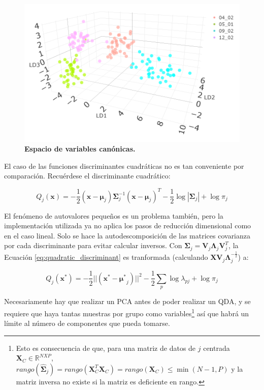 \documentclass[12pt]{article}
\begin{document}
\begin{figure}[htbp]
    \centering
    \includegraphics[width=14cm]{LDAspace.png}
    \caption{\textbf{Espacio de variables canónicas.}}
    \label{fig:LDAspace}
\end{figure}

El caso de las funciones discriminantes cuadráticas no es tan conveniente por comparación. Recuérdese el discriminante cuadrático:

\begin{equation} \label{eq:quadratic_discriminant}
Q_j (\mathbf{x}) = - \frac{1}{2} (\mathbf{x} - \boldsymbol{\mu}_j) \boldsymbol{\Sigma}_j^{-1} (\mathbf{x} - \boldsymbol{\mu}_j)^T  - \frac{1}{2} \log |\boldsymbol{\Sigma}_j| + \log \pi_j
\end{equation}

El fenómeno de autovalores pequeños es un problema también, pero la implementación utilizada ya no aplica los pasos de reducción dimensional como en el caso lineal. Solo se hace la autodescomposición de las matrices covarianza por cada discriminante para evitar calcular inversos. Con $\boldsymbol{\Sigma}_j = \mathbf{V}_j \boldsymbol{\Lambda}_j \mathbf{V}_j^T$, la Ecuación \ref{eq:quadratic_discriminant} es tranformada (calculando $\mathbf{X} \mathbf{V}_j \boldsymbol{\Lambda}_j^{-\frac{1}{2}}$) a:

\begin{equation} \label{eq:quadratic_discriminant_proy}
Q_j (\mathbf{x}^{*}) = - \frac{1}{2} ||(\mathbf{x}^{*} - {\mathbf{\mu}^{*}}_j) ||^2   - \frac{1}{2} \sum_p \log \lambda_{pj} + \log \pi_j
\end{equation}

Necesariamente hay que realizar un PCA antes de poder realizar un QDA, y se requiere que haya tantas muestras por grupo como variables\footnote{Esto es consecuencia de que, para una matriz de datos de  $j$ centrada $\mathbf{X}_C \in \mathbb{R}^{NXP}$, $rango(\hat{\boldsymbol{\Sigma}}_j) = rango(\mathbf{X}^T_C \mathbf{X}_C) = rango(\mathbf{X}_C) \le \min (N - 1,P)$ y la matriz inversa no existe si la matriz es deficiente en rango.} así que habrá un límite al número de componentes que pueda tomarse. 
\end{document}
